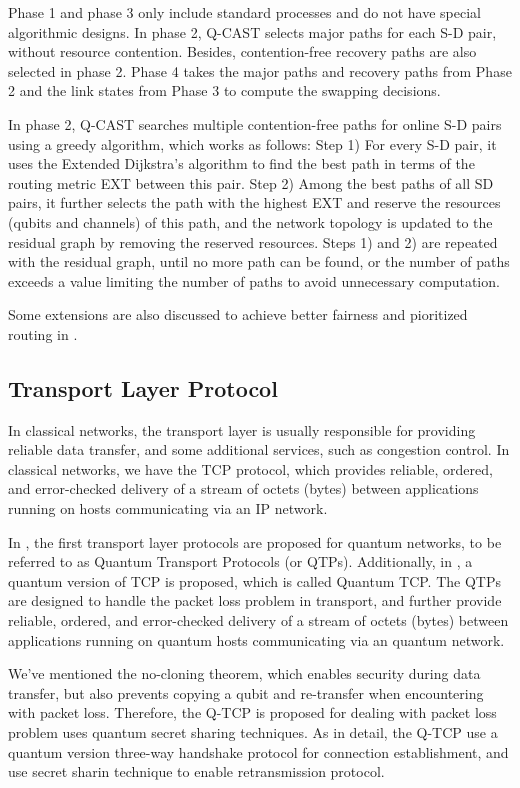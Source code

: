 \documentclass[10pt]{article}
\begin{document}
Phase 1 and phase 3 only include standard processes
and do not have special algorithmic designs.  In phase 2, Q-CAST selects major paths for each S-D pair, without resource contention. Besides, contention-free recovery paths are also selected in phase 2. Phase 4 takes the major paths and recovery paths from Phase 2 and the link states from Phase 3 to compute the swapping decisions.

In phase 2, Q-CAST searches multiple contention-free paths for online S-D pairs using a greedy algorithm, which works as follows: Step 1) For every S-D pair, it uses the Extended Dijkstra’s algorithm to find the best path in terms of the routing metric EXT between this pair. Step 2) Among the best paths of all SD pairs, it further selects the path with the highest EXT and reserve the resources (qubits and channels) of this path, and the network topology is updated to the residual graph by removing the reserved resources. 
Steps 1) and 2) are repeated with the residual graph, until no more path can be found, or the number of paths exceeds a value limiting the number of paths to avoid unnecessary computation. 

Some extensions are also discussed to achieve better fairness and pioritized routing in \cite{shi2020concurrent}.

\subsection{Transport Layer Protocol}

In classical networks, the transport layer is usually responsible for providing reliable data transfer, and some additional services, such as congestion control. In classical networks, we have the TCP protocol, which provides reliable, ordered, and error-checked delivery of a stream of octets (bytes) between applications running on hosts communicating via an IP network.

In \cite{zhao2021redundant}, the first transport layer protocols are proposed for quantum networks, to be referred to as Quantum Transport Protocols (or QTPs). Additionally, in \cite{yu2021protocols}, a quantum version of TCP is proposed, which is called Quantum TCP. The QTPs are designed to handle the packet loss problem in transport, and further provide reliable, ordered, and error-checked delivery of a stream of octets (bytes) between applications running on quantum hosts communicating via an quantum network. 

We've mentioned the no-cloning theorem, which enables security during data transfer, but also prevents copying a qubit and re-transfer when encountering with packet loss. Therefore, the Q-TCP is proposed for dealing with packet loss problem uses quantum secret sharing techniques. As in detail, the Q-TCP use a quantum version three-way handshake protocol for connection establishment, and use secret sharin technique to enable retransmission protocol. 
\end{document}
